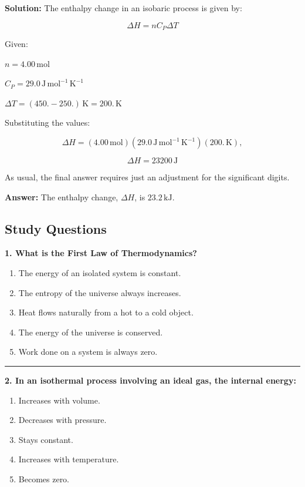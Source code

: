 \documentclass[
  9pt,
]{extbook}
\providecommand{\tightlist}{%
  \setlength{\itemsep}{0pt}\setlength{\parskip}{0pt}}
\theoremstyle{definition}
\theoremstyle{definition}
\theoremstyle{definition}
\theoremstyle{definition}
\theoremstyle{remark}
\begin{document}
\textbf{Solution:} The enthalpy change in an isobaric process is given by:

\[ \Delta H = n C_P \Delta T \]

Given:

\(n = 4.00 \, \text{mol}\)

\(C_P = 29.0 \, \text{J} \, \text{mol}^{-1} \, \text{K}^{-1}\)

\(\Delta T = (450. - 250.) \, \text{K} = 200. \, \text{K}\)

Substituting the values:

\[ \Delta H = (4.00\, \text{mol}) (29.0 \, \text{J} \, \text{mol}^{-1} \, \text{K}^{-1}) (200.\,\text{K}),\]

\[ \Delta H = 23200 \, \text{J} \]

As usual, the final answer requires just an adjustment for the significant digits.

\textbf{Answer:} The enthalpy change, \(\Delta H\), is \(23.2 \, \text{kJ}\).

\subsection{Study Questions}\label{quest3}

\textbf{1. What is the First Law of Thermodynamics?}

\begin{enumerate}
\def\labelenumi{\alph{enumi}.}
\tightlist
\item
  The energy of an isolated system is constant.
\item
  The entropy of the universe always increases.
\item
  Heat flows naturally from a hot to a cold object.
\item
  The energy of the universe is conserved.
\item
  Work done on a system is always zero.
\end{enumerate}

\begin{center}\rule{0.5\linewidth}{0.5pt}\end{center}

\textbf{2. In an isothermal process involving an ideal gas, the internal energy:}

\begin{enumerate}
\def\labelenumi{\alph{enumi}.}
\tightlist
\item
  Increases with volume.
\item
  Decreases with pressure.
\item
  Stays constant.
\item
  Increases with temperature.
\item
  Becomes zero.
\end{enumerate}
\end{document}
